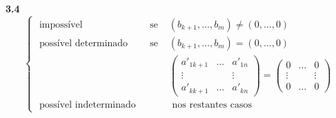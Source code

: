 \documentclass{beamer}
\begin{document}
\begin{frame}{\bf 3.4}{}
$$\left\{ \begin{array}{lcl} \mbox{ impossível } & \mbox{ se } & (b_{k+1}, \ldots, b_m) \neq (0,\ldots, 0)\\ 
 \mbox{ possível determinado } & \mbox{ se } & (b_{k+1}, \ldots, b_m) = (0,\ldots, 0) \\
&& \left(\begin{array}{ccc} a'_{1{k+1}} & \ldots & a'_{1n} \\ \vdots & &\vdots \\ a'_{k{k+1}} & \ldots & a'_{kn} \end{array}\right)
= \left(\begin{array}{ccc} 0 & \ldots & 0 \\ \vdots & &\vdots \\ 0 & \ldots & 0 \end{array}\right)\\
 \mbox{ possível indeterminado } & \mbox{ } & \mbox{ nos restantes casos}
\end{array}\right.$$
\end{frame}
\end{document}
